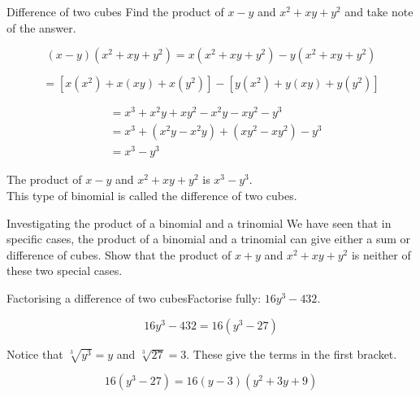 \begin{wex}{Difference of two cubes }{Find the product of $x-y$ and ${x}^{2}+xy+{y}^{2}$ and take note of the answer.}{
\begin{equation*}
(x-y)({x}^{2}+xy+{y}^{2}) = x({x}^{2}+xy+{y}^{2})-y({x}^{2}+ xy+{y}^{2})
\end{equation*}

\begin{equation*}
  = \left[x({x}^{2})+x(xy)+x({y}^{2})\right]-\left[y({x}^{2})+y(xy)+y({y}^{2})\right]
\end{equation*}

\begin{align*}
  &= {x}^{3}+{x}^{2}y+x{y}^{2}-{x}^{2}y-x{y}^{2}-{y}^{3} \\
  &= {x}^{3}+({x}^{2}y-{x}^{2}y)+(x{y}^{2}-x{y}^{2})-{y}^{3} \\
  &= {x}^{3}-{y}^{3}
\end{align*}

The product of $x-y$ and ${x}^{2}+xy+{y}^{2}$ is ${x}^{3}-{y}^{3}$. \\
This type of binomial is called the difference of two cubes. 
}
\end{wex}


\begin{activity}{Investigating the product of a binomial and a trinomial}
 We have seen that in specific cases, the product of a binomial and a trinomial can give either a sum or difference of cubes. Show that the product of $x+y$ and ${x}^{2}+xy+{y}^{2}$ is neither of these two special cases.
\end{activity}



\begin{wex}{Factorising a difference of two cubes}{Factorise fully: $16y^{3} - 432$.}
{
\begin{equation*}
  16y^{3} - 432 = 16(y^{3} - 27)
\end{equation*}

Notice that $\sqrt[3]{y^{3}} = y$ and $\sqrt[3]{27} = 3$. These give the terms in the first bracket.

\begin{equation*}
  16(y^{3} - 27) = 16(y-3)(y^{2}+3y+9)
\end{equation*}

}
\end{wex}


